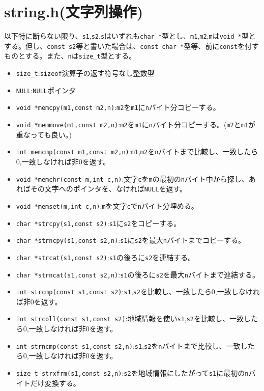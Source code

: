 \section{string.h(文字列操作)}
以下特に断らない限り、\verb|s1|,\verb|s2|,\verb|s|はいずれも\verb|char *|型とし、\verb|m1|,\verb|m2|,\verb|m|は\verb|void *|型とする。但し、\verb|const s2|等と書いた場合は、\verb|const char *|型等、前に\verb|const|を付すものとする。また、\verb|n|は\verb|size_t|型とする。
\begin{itemize}
\item \verb|size_t|:\verb|sizeof|演算子の返す符号なし整数型
\item \verb|NULL|:\verb|NULL|ポインタ
\item \verb|void *memcpy(m1,const m2,n)|:\verb|m2|を\verb|m1|に\verb|n|バイト分コピーする。
\item \verb|void *memmove(m1,const m2,n)|:\verb|m2|を\verb|m1|に\verb|n|バイト分コピーする。(\verb|m2|と\verb|m1|が重なっても良い。)
\item \verb|int memcmp(const m1,const m2,n)|:\verb|m1|,\verb|m2|を\verb|n|バイトまで比較し、一致したら0,一致しなければ非0を返す。
\item \verb|void *memchr(const m,int c,n)|:文字\verb|c|を\verb|m|の最初の\verb|n|バイト中から探し、あればその文字へのポインタを、なければ\verb|NULL|を返す。
\item \verb|void *memset(m,int c,n)|:\verb|m|を文字\verb|c|で\verb|n|バイト分埋める。
\item \verb|char *strcpy(s1,const s2)|:\verb|s1|に\verb|s2|をコピーする。
\item \verb|char *strncpy(s1,const s2,n)|:\verb|s1|に\verb|s2|を最大\verb|n|バイトまでコピーする。
\item \verb|char *strcat(s1,const s2)|:\verb|s1|の後ろに\verb|s2|を連結する。
\item \verb|char *strncat(s1,const s2,n)|:\verb|s1|の後ろに\verb|s2|を最大\verb|n|バイトまで連結する。
\item \verb|int strcmp(const s1,const s2)|:\verb|s1|,\verb|s2|を比較し、一致したら0,一致しなければ非0を返す。
\item \verb|int strcoll(const s1,const s2)|:地域情報を使い\verb|s1|,\verb|s2|を比較し、一致したら0,一致しなければ非0を返す。
\item \verb|int strncmp(const s1,const s2,n)|:\verb|s1|,\verb|s2|を\verb|n|バイトまで比較し、一致したら0,一致しなければ非0を返す。
\item \verb|size_t strxfrm(s1,const s2,n)|:\verb|s2|を地域情報にしたがって\verb|s1|に最初の\verb|n|バイトだけ変換する。

\end{itemize}
